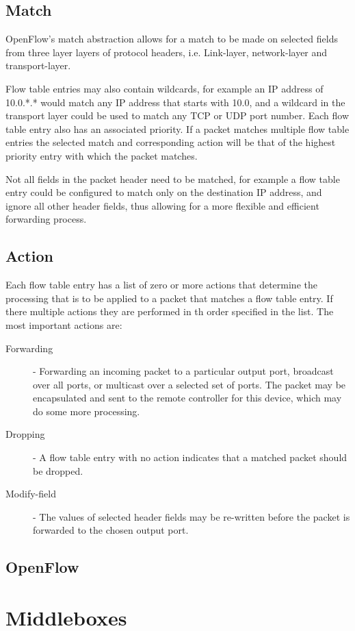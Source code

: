 \documentclass[12pt letter]{report}
\begin{document}
\section{Match}

OpenFlow's match abstraction allows for a match to be made on
selected fields from three layer layers of protocol headers, i.e.
Link-layer, network-layer and transport-layer.

Flow table entries may also contain wildcards, for example an IP
address of 10.0.*.* would match any IP address that starts with 10.0,
and a wildcard in the transport layer could be used to match any TCP
or UDP port number. Each flow table entry also has an associated
priority. If a packet matches multiple flow table entries the
selected match and corresponding action will be that of the highest
priority entry with which the packet matches.

Not all fields in the packet header need to be matched, for example a
flow table entry could be configured to match only on the destination
IP address, and ignore all other header fields, thus allowing for a
more flexible and efficient forwarding process.

\section{Action}

Each flow table entry has a list of zero or more actions that
determine the processing that is to be applied to a packet that
matches a flow table entry. If there multiple actions they are
performed in th order specified in the list. The most important actions are:
\begin{description}
  \item[Forwarding]  - Forwarding an incoming packet to a particular
    output port, broadcast over all ports, or multicast over a
    selected set of ports. The packet may be encapsulated and sent to
    the remote controller for this device, which may do some more processing.
  \item[Dropping] - A flow table entry with no action indicates that
    a matched packet should be dropped.
  \item[Modify-field] - The values of selected header fields may be
    re-written before the packet is forwarded to the chosen output port.
\end{description}

\section{OpenFlow}

\chapter{Middleboxes}
\end{document}
